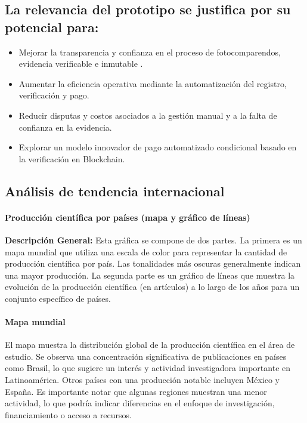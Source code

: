 \subsection{La relevancia del prototipo se justifica por su potencial para:} 
\begin{itemize}
\item Mejorar la transparencia y confianza en el proceso de fotocomparendos, evidencia verificable e inmutable \parencite{meroni2023editorial,thanasas2025enhancing}. 

\item Aumentar la eficiencia operativa mediante la automatización del registro, verificación y pago. 

\item Reducir disputas y costos asociados a la gestión manual y a la falta de confianza en la evidencia. 

\item Explorar un modelo innovador de pago automatizado condicional basado en la verificación en Blockchain. 
\end{itemize}
\subsection{Análisis de tendencia internacional}
\paragraph{Producción científica por países (mapa y gráfico de líneas)}
 
 \textbf{Descripción General:} Esta gráfica se compone de dos partes. La primera es un mapa mundial que utiliza una escala de color para representar la cantidad de producción científica por país. Las tonalidades más oscuras generalmente indican una mayor producción. La segunda parte es un gráfico de líneas que muestra la evolución de la producción científica (en artículos) a lo largo de los años para un conjunto específico de países. 
\paragraph{Mapa mundial}
El mapa muestra la distribución global de la producción científica en el área de estudio. Se observa una concentración significativa de publicaciones en países como Brasil, lo que sugiere un interés y actividad investigadora importante en Latinoamérica. Otros países con una producción notable incluyen México y España. Es importante notar que algunas regiones muestran una menor actividad, lo que podría indicar diferencias en el enfoque de investigación, financiamiento o acceso a recursos. 

